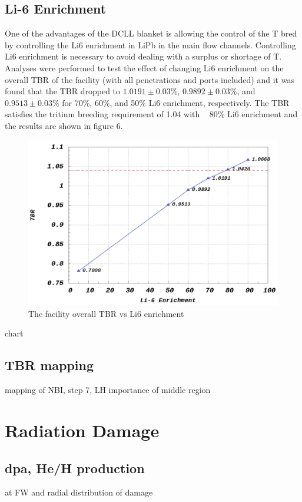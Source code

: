\documentclass[12pt, letterpaper]{elsarticle}
\begin{document}
\subsection{Li-6 Enrichment} \label{Li-6 Enrichment}
One of the advantages of the DCLL blanket is allowing the control of the T bred by controlling the  Li6 enrichment in LiPb in the main flow channels. Controlling Li6 enrichment is necessary to avoid dealing with a surplus or shortage of T. Analyses were performed to test the effect of changing Li6 enrichment on the overall TBR of the facility (with all penetrations and ports included) and it was found that the TBR dropped to $1.0191\pm 0.03\%$, $0.9892\pm 0.03\%$, and $0.9513\pm 0.03\%$ for 70\%, 60\%, and 50\% Li6  enrichment, respectively. The TBR satisfies the tritium breeding requirement of 1.04 with ~ 80\% Li6 enrichment and the results are shown in figure 6.
\begin{figure}[h!]
  \centering
  \includegraphics[scale=0.2]{../plots/Li6_enrichment.png}
  \caption{The facility overall TBR vs Li6 enrichment}
  \label{fig:Li6_enrichment}
\end{figure}
chart
\subsection{TBR mapping} \label{TBR mapping}
mapping of NBI, step 7, LH
importance of middle region

\section{Radiation Damage} \label{Radiation Damage}
\subsection{dpa, He/H production} \label{dpa, He/H production}
at FW and radial distribution of damage
\end{document}
